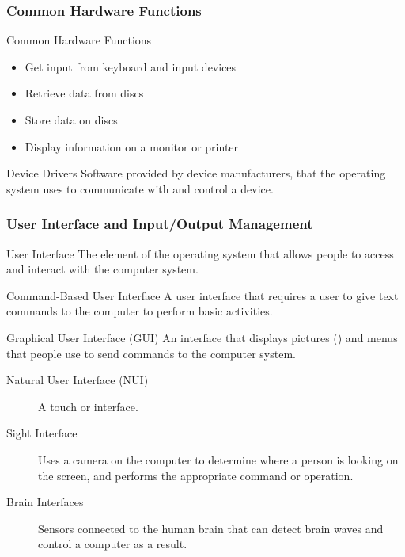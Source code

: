 \documentclass[\main/notes.tex]{subfiles}
\begin{document}
				\subsubsection{Common Hardware Functions}
					\begin{sidenote}{Common Hardware Functions}
						\begin{multicols}{3}
							\begin{itemize}[nosep]
								\item Get input from keyboard and input devices
								\item Retrieve data from discs
								\item Store data on discs
								\item Display information on a monitor or printer
							\end{itemize}
						\end{multicols}
					\end{sidenote}
					\begin{definition}{Device Drivers}
						Software provided by device manufacturers, that the operating system uses to communicate with and control a device.
					\end{definition}
				\subsubsection{User Interface and Input/Output Management}
					\begin{definition}{User Interface}
						The element of the operating system that allows people to access and interact with the computer system.
					\end{definition}
					\begin{definition}{Command-Based User Interface}
						A user interface that requires a user to give text commands to the computer to perform basic activities.
					\end{definition}
					\begin{definition}{Graphical User Interface (GUI)}
						An interface that displays pictures () and menus that people use to send commands to the computer system.
						\begin{description}
							\item[Natural User Interface (NUI)] A touch or  interface.
							\item[Sight Interface] Uses a camera on the computer to determine where a person is looking on the screen, and performs the appropriate command or operation.
							\item[Brain Interfaces] Sensors connected to the human brain that can detect brain waves and control a computer as a result.
						\end{description}
					\end{definition}
\end{document}
